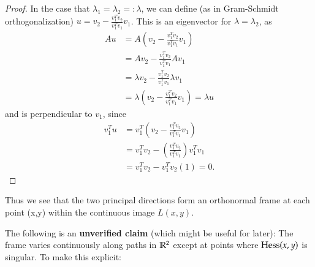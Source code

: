 \begin{proof}
		In the case that $\lambda_1 = \lambda_2 =: \lambda$, we can define
		(as in Gram-Schmidt orthogonalization) $u = v_2 - \frac{v_1^Tv_2}{v_1^Tv_1}v_1$.
		This is an eigenvector for $\lambda=\lambda_2$, as
		\begin{align*}
		Au &= A\left(v_2 - \frac{v_1^Tv_2}{v_1^Tv_1} v_1\right) \\
		   &= A v_2 - \frac{v_1^Tv_2}{v_1^Tv_1} A v_1 \\
		   &= \lambda v_2- \frac{v_1^Tv_2}{v_1^Tv_1} \lambda v_1 \\
		   &= \lambda \left( v_2 - \frac{v_1^Tv_2}{v_1^Tv_1} v_1 \right) = \lambda u
		\end{align*}
		and is perpendicular to $v_1$, since
			\begin{align*}
			v_1^T u &= v_1^T\left(v_2 - \frac{v_1^Tv_2}{v_1^Tv_1}v_1\right) \\
					&= v_1^T v_2 - \left(\frac{v_1^Tv_2}{v_1^Tv_1}\right) v_1^T v_1 \\
					&= v_1^T v_2 - v_1^Tv_2 (1) = 0.
			\end{align*}
	\end{proof}
	
        Thus we see that the two principal directions form an orthonormal frame at each point (x,y) within the continuous image $L(x,y)$.

        \maltese The following is an \textbf{unverified claim} (which might be useful for later):
            The frame varies continuously along paths in $\mathbb{R}^2$
            except at points where $\mathrm{Hess}(x,y)$ is singular.
        To make this explicit:

